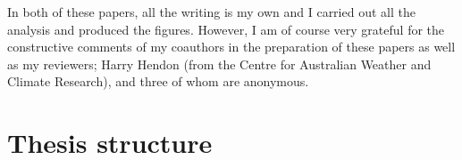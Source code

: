 In both of these papers, all the writing is my own and I carried out all the
analysis and produced the figures. However, I am of course very grateful for the
constructive comments of my coauthors in the preparation of these papers as well
as my reviewers; Harry Hendon (from the Centre for Australian Weather and
Climate Research), and three of whom are anonymous.

\section{Thesis structure}









